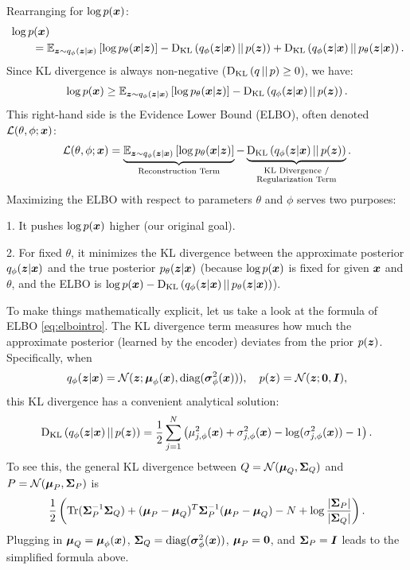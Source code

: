 Rearranging for $\log p(\boldsymbol{x})$:
\begin{align}
     & \log p(\boldsymbol{x}) \nonumber                                                                                                                                                 \\
     & \quad \quad = \mathbb{E}_{\boldsymbol{z} \sim q_{\phi}(\boldsymbol{z}|\boldsymbol{x})} \left[ \log p_{\theta}(\boldsymbol{x}|\boldsymbol{z}) \right] - \text{D}_{\text{KL}}\left(q_{\phi}(\boldsymbol{z}|\boldsymbol{x}) \,||\, p(\boldsymbol{z})\right) + \text{D}_{\text{KL}}\left(q_{\phi}(\boldsymbol{z}|\boldsymbol{x}) \,||\, p_{\theta}(\boldsymbol{z}|\boldsymbol{x})\right).
\end{align}
Since KL divergence is always non-negative ($\text{D}_{\text{KL}}\left(q \,||\, p\right) \ge 0$), we have:
\begin{align}
    \log p(\boldsymbol{x}) \ge \mathbb{E}_{\boldsymbol{z} \sim q_{\phi}(\boldsymbol{z}|\boldsymbol{x})} \left[ \log p_{\theta}(\boldsymbol{x}|\boldsymbol{z}) \right] - \text{D}_{\text{KL}}\left(q_{\phi}(\boldsymbol{z}|\boldsymbol{x}) \,||\, p(\boldsymbol{z})\right).
\end{align}
This right-hand side is the Evidence Lower Bound (ELBO), often denoted $\mathcal{L}(\theta, \phi; \boldsymbol{x})$:
\begin{align}
    \mathcal{L}(\theta, \phi; \boldsymbol{x}) = \underbrace{\mathbb{E}_{\boldsymbol{z} \sim q_{\phi}(\boldsymbol{z}|\boldsymbol{x})} \left[ \log p_{\theta}(\boldsymbol{x}|\boldsymbol{z}) \right]}_{\text{Reconstruction Term}} - \underbrace{\text{D}_{\text{KL}}\left(q_{\phi}(\boldsymbol{z}|\boldsymbol{x}) \,||\, p(\boldsymbol{z})\right)}_{\substack{\text{KL Divergence /} \\ \text{Regularization Term}}}.
    \label{eq:elbointro}
\end{align}
Maximizing the ELBO with respect to parameters $\theta$ and $\phi$ serves two purposes:

1. It pushes $\log p(\boldsymbol{x})$ higher (our original goal).

2. For fixed $\theta$, it minimizes the KL divergence between the approximate posterior $q_{\phi}(\boldsymbol{z}|\boldsymbol{x})$ and the true posterior $p_{\theta}(\boldsymbol{z}|\boldsymbol{x})$ (because $\log p(\boldsymbol{x})$ is fixed for given $\boldsymbol{x}$ and $\theta$, and the ELBO is $\log p(\boldsymbol{x}) - \text{D}_{\text{KL}}\left(q_{\phi}(\boldsymbol{z}|\boldsymbol{x}) \,||\, p_{\theta}(\boldsymbol{z}|\boldsymbol{x})\right)$).

To make things mathematically explicit, let us take a look at the formula
of ELBO \eqref{eq:elbointro}. The KL divergence term measures how much the
approximate posterior (learned by the encoder) deviates from the prior
$p(\boldsymbol{z})$. Specifically, when
\begin{align}
    q_{\phi}(\boldsymbol{z}|\boldsymbol{x}) = \mathcal{N}(\boldsymbol{z}; \boldsymbol{\mu}_{\phi}(\boldsymbol{x}), \text{diag}(\boldsymbol{\sigma}^2_{\phi}(\boldsymbol{x}))), \quad p(\boldsymbol{z}) = \mathcal{N}(\boldsymbol{z}; \mathbf{0}, \boldsymbol{I}),
\end{align}
this KL divergence has a convenient analytical solution:
\begin{align}
    \text{D}_{\text{KL}}\left(q_{\phi}(\boldsymbol{z}|\boldsymbol{x}) \,||\, p(\boldsymbol{z})\right) = \frac{1}{2} \sum_{j=1}^{N} \left( \mu_{j, \phi}^2(\boldsymbol{x}) + \sigma_{j, \phi}^2(\boldsymbol{x}) - \log(\sigma_{j, \phi}^2(\boldsymbol{x})) - 1 \right).
    \label{eq:kl_gaussian}
\end{align}
To see this, the general KL divergence between $Q = \mathcal{N}(\boldsymbol{\mu}_Q, \boldsymbol{\Sigma}_Q)$ and $P = \mathcal{N}(\boldsymbol{\mu}_P, \boldsymbol{\Sigma}_P)$ is
\begin{align}
    \frac{1}{2} \left( \text{Tr}(\boldsymbol{\Sigma}_P^{-1} \boldsymbol{\Sigma}_Q) + (\boldsymbol{\mu}_P - \boldsymbol{\mu}_Q)^T \boldsymbol{\Sigma}_P^{-1} (\boldsymbol{\mu}_P - \boldsymbol{\mu}_Q) - N + \log \frac{|\boldsymbol{\Sigma}_P|}{|\boldsymbol{\Sigma}_Q|} \right).
\end{align}
Plugging in $\boldsymbol{\mu}_Q = \boldsymbol{\mu}_{\phi}(\boldsymbol{x})$, $\boldsymbol{\Sigma}_Q = \text{diag}(\boldsymbol{\sigma}^2_{\phi}(\boldsymbol{x}))$, $\boldsymbol{\mu}_P = \mathbf{0}$, and $\boldsymbol{\Sigma}_P = \boldsymbol{I}$ leads to the simplified formula above.

